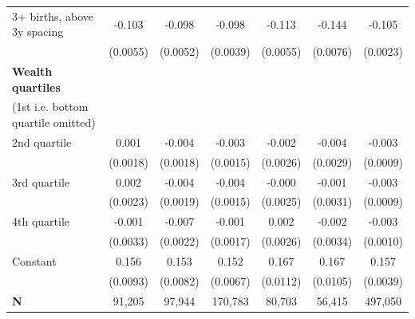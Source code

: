 {\begin{tabular}{l*{6}{c}}
\addlinespace
\hspace*{1em}3+ births, above 3y spacing&      -0.103\sym{***}&      -0.098\sym{***}&      -0.098\sym{***}&      -0.113\sym{***}&      -0.144\sym{***}&      -0.105\sym{***}\\
                    &    (0.0055)         &    (0.0052)         &    (0.0039)         &    (0.0055)         &    (0.0076)         &    (0.0023)         \\
\addlinespace
\textbf{Wealth quartiles} \\ (1st i.e. bottom quartile omitted)&                     &                     &                     &                     &                     &                     \\
\addlinespace
\hspace*{1em}2nd quartile        &       0.001         &      -0.004\sym{*}  &      -0.003\sym{*}  &      -0.002         &      -0.004         &      -0.003\sym{**} \\
                    &    (0.0018)         &    (0.0018)         &    (0.0015)         &    (0.0026)         &    (0.0029)         &    (0.0009)         \\
\addlinespace
\hspace*{1em}3rd quartile        &       0.002         &      -0.004\sym{*}  &      -0.004\sym{*}  &      -0.000         &      -0.001         &      -0.003\sym{**} \\
                    &    (0.0023)         &    (0.0019)         &    (0.0015)         &    (0.0025)         &    (0.0031)         &    (0.0009)         \\
\addlinespace
\hspace*{1em}4th quartile        &      -0.001         &      -0.007\sym{**} &      -0.001         &       0.002         &      -0.002         &      -0.003\sym{***}\\
                    &    (0.0033)         &    (0.0022)         &    (0.0017)         &    (0.0026)         &    (0.0034)         &    (0.0010)         \\
\addlinespace
\hspace*{1em}Constant            &       0.156\sym{***}&       0.153\sym{***}&       0.152\sym{***}&       0.167\sym{***}&       0.167\sym{***}&       0.157\sym{***}\\
                    &    (0.0093)         &    (0.0082)         &    (0.0067)         &    (0.0112)         &    (0.0105)         &    (0.0039)         \\
\midrule
\textbf{N}          &      91,205         &      97,944         &     170,783         &      80,703         &      56,415         &     497,050         \\
\bottomrule
\end{tabular}
}
